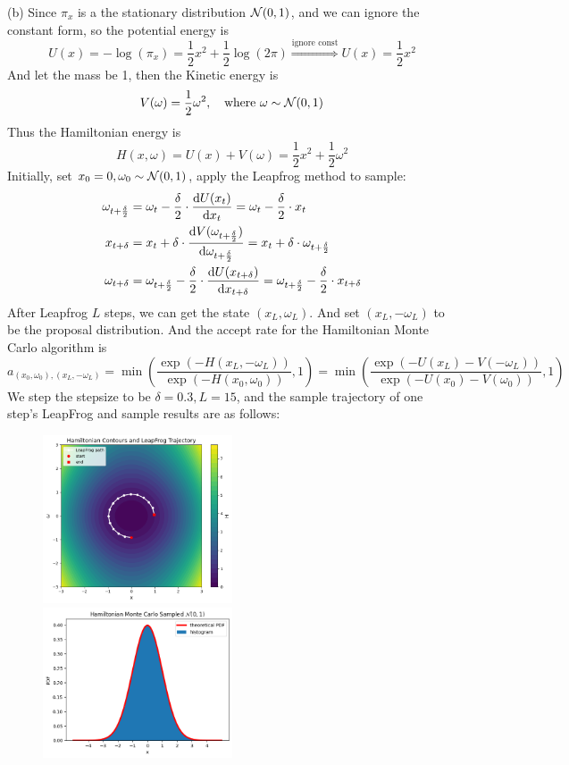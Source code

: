 \begin{homeworkProblem}
(b) Since $\pi_x$ is a the stationary distribution $\mathcal{N}(0,1)$, and we can ignore the constant form, so the potential energy is
$$U(x)=-\log(\pi_x)=\dfrac{1}{2}x^2 + \dfrac{1}{2}\log(2\pi) \stackrel{\text{ignore const}}{\Rightarrow} U(x)=\dfrac{1}{2}x^2$$
And let the mass be 1, then the Kinetic energy is
$$V(\omega)=\dfrac{1}{2}\omega^2, \quad\text{where } \omega\sim\mathcal{N}(0,1)$$
Thus the Hamiltonian energy is
$$H(x,\omega)=U(x)+V(\omega)=\dfrac{1}{2}x^2+\dfrac{1}{2}\omega^2$$
Initially, set $x_0=0, \omega_0\sim\mathcal{N}(0,1)$, apply the Leapfrog method to sample:
\begin{align*}
\omega_{t+\frac{\delta}{2}} &= \omega_t - \frac{\delta}{2}\cdot \dfrac{\mathrm{d}U(x_t)}{\mathrm{d}x_t} = \omega_t - \frac{\delta}{2}\cdot x_t \\
x_{t+\delta} &= x_t + \delta \cdot \dfrac{\mathrm{d}V(\omega_{t+\frac{\delta}{2}})}{\mathrm{d}\omega_{t+\frac{\delta}{2}}} = x_t + \delta\cdot \omega_{t+\frac{\delta}{2}} \\
\omega_{t+\delta} &= \omega_{t+\frac{\delta}{2}} - \frac{\delta}{2}\cdot \dfrac{\mathrm{d}U(x_{t+\delta})}{\mathrm{d}x_{t+\delta}} = \omega_{t+\frac{\delta}{2}} - \frac{\delta}{2}\cdot x_{t+\delta}
\end{align*}
After Leapfrog $L$ steps, we can get the state $(x_L, \omega_L)$. And set $(x_L, -\omega_L)$ to be the proposal distribution. And the accept rate for the Hamiltonian Monte Carlo algorithm is
$$a_{(x_0,\omega_0),(x_L,-\omega_L)}=\min\left(\dfrac{\exp\left(-H(x_L,-\omega_L)\right)}{\exp\left(-H(x_0,\omega_0)\right)}, 1\right)=\min\left(\dfrac{\exp\left(-U(x_L)-V(-\omega_L)\right)}{\exp\left(-U(x_0)-V(\omega_0)\right)}, 1\right)$$
We step the stepsize to be $\delta=0.3, L=15$, and the sample trajectory of one step's LeapFrog and sample results are as follows:
\begin{figure}[h]
    \centering
    \includegraphics[width=0.5\textwidth]{./figure/p4/trajectory.png}
    \includegraphics[width=0.5\textwidth]{./figure/p4/Hamiltonian.png}
\end{figure}


\end{homeworkProblem}
